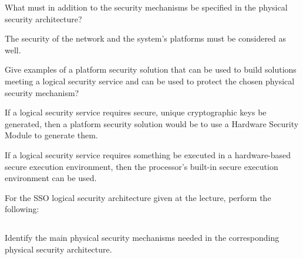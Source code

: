 \begin{questions}
\question{} What must in addition to the security mechanisms be specified in the physical security architecture?
  \begin{solution}
    The security of the network and the system's platforms must be considered as well.
  \end{solution}

\question{} Give examples of a platform security solution that can be used to build solutions meeting a logical security service and can be used to protect the chosen physical security mechanism?
  \begin{solution}
    If a logical security service requires secure, unique cryptographic keys be generated, then a platform security solution would be to use a Hardware Security Module to generate them.

    If a logical security service requires something be executed in a hardware-based secure execution environment, then the processor's built-in secure execution environment can be used.
  \end{solution}

\question{} For the SSO logical security architecture given at the lecture, perform the following:
  \begin{parts}
  \part{} Identify the main physical security mechanisms needed in the corresponding physical security architecture.

\end{parts}
\end{questions}
